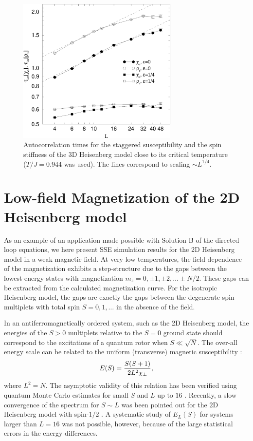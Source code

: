 \documentclass[10pt,pre,aps,twocolumn,showpacs,superscriptaddress,
floatfix]{revtex4}
\begin{document}
\begin{figure}
\includegraphics[clip,width=8cm]{fig28.eps}
\caption{Autocorrelation times for the staggered susceptibility and the
spin stiffness of the 3D Heisenberg model close to its critical temperature 
($T/J=0.944$ was used). The lines correspond to scaling $\sim L^{1/4}$.} 
\label{logtau3d}
\end{figure}

\section{Low-field Magnetization of the 2D Heisenberg model}

As an example of an application made possible with Solution B of the 
directed loop equations, we here present SSE simulation results for the 2D 
Heisenberg model in a weak magnetic field. At very low temperatures, the 
field dependence of the magnetization exhibits a step-structure due to the 
gaps between the lowest-energy states with magnetization 
$m_z=0,\pm 1,\pm 2,\ldots \pm N/2$. These gaps can be extracted from the 
calculated magnetization curve. For the isotropic Heisenberg model, the gaps 
are exactly the gaps between the degenerate spin multiplets with total spin 
$S=0,1,\ldots$ in the absence of the field. 

In an antiferromagnetically ordered system, such as the 2D Heisenberg model, 
the energies of the $S > 0$ multiplets relative to the $S=0$ ground state 
should correspond to the excitations of a quantum rotor when $S \ll \sqrt{N}$.
The over-all energy scale can be related to the uniform (transverse) magnetic 
susceptibility \cite{rotor}:
\begin{equation}
E(S) = {S(S+1)\over 2L^2 \chi_\perp},
\label{rspectrum}
\end{equation}
where $L^2 = N$. The asymptotic validity of this 
relation has been verified using quantum Monte Carlo estimates for small 
$S$ and $L$ up to $16$  \cite{runge,lavalle}. Recently, a slow convergence 
of the spectrum for $S \sim L$ was been pointed out for the 2D Heisenberg 
model with spin-$1/2$ \cite{lavalle}. A systematic study of $E_L(S)$ for 
systems larger than $L=16$ was not possible, however, because of the large 
statistical errors in the energy differences.
\end{document}
